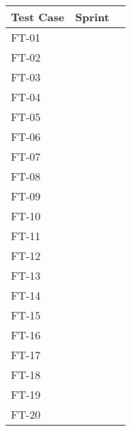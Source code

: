 
\begin{tabular}{| l | l | l |}
	\hline
	\rowcolor{lightgray}
	{\bf Test Case} & {\bf Sprint} \\ \hline
	FT-01 & \\ \hline
	FT-02 & \\ \hline
	FT-03 & \\ \hline
	FT-04 & \\ \hline
	FT-05 & \\ \hline
	FT-06 & \\ \hline
	FT-07 & \\ \hline
	FT-08 & \\ \hline
	FT-09 & \\ \hline
	FT-10 & \\ \hline
	FT-11 & \\ \hline
	FT-12 & \\ \hline
	FT-13 & \\ \hline
	FT-14 & \\ \hline
	FT-15 & \\ \hline
	FT-16 & \\ \hline
	FT-17 & \\ \hline
	FT-18 & \\ \hline
	FT-19 & \\ \hline
	FT-20 & \\
	\hline
\end{tabular}